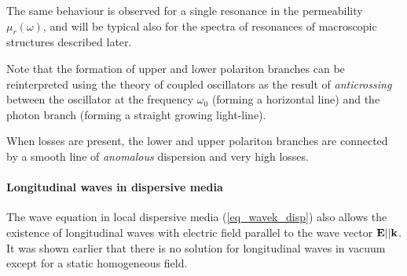 The same behaviour is observed for a single resonance in the permeability $\mu_r(\omega)$, and will be typical also for the spectra of resonances of macroscopic structures described later.

Note that the formation of upper and lower polariton branches can be reinterpreted\cite{landau1984electrodynamics} using the theory of coupled oscillators as the result of \textit{anticrossing} between the oscillator at the frequency $\omega_0$ (forming a horizontal line) and the photon branch (forming a straight growing light-line).

When losses are present, the lower and upper polariton branches are connected by a smooth line of \textit{anomalous} dispersion and very high losses.  %
\paragraph{Longitudinal waves in dispersive media} %
The wave equation in local dispersive media (\ref{eq_wavek_disp}) 
also allows the existence of longitudinal waves with electric field parallel to the wave vector $\mathbf{E} || {\mathbf{k}}$. It was shown earlier that there is no solution for longitudinal waves in vacuum except for a static homogeneous field.

